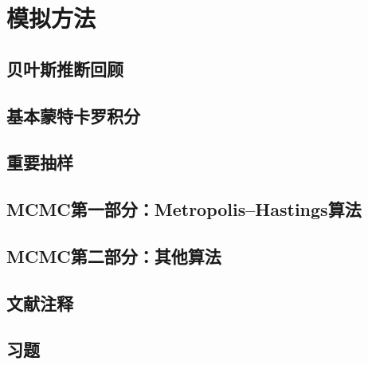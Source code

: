 \chapter{模拟方法}

\section{贝叶斯推断回顾}

\pending

\section{基本蒙特卡罗积分}

\pending

\section{重要抽样}

\pending

\section{MCMC第一部分：Metropolis--Hastings算法}

\pending

\section{MCMC第二部分：其他算法}

\pending

\section{文献注释}

\pending

\section{习题}

\pending
